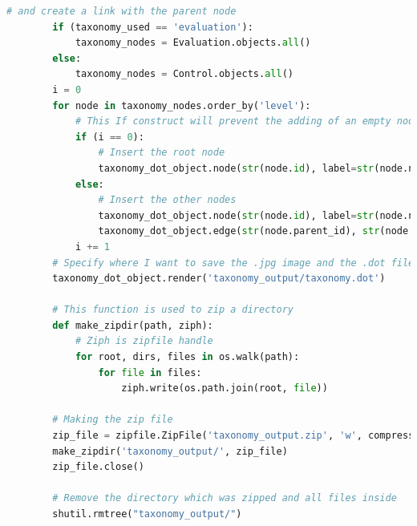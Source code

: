 \begin{itemize}
\begin{lstlisting}[language=Python, label=lst:view_DOT_eval, caption={Codice utilizzato per la realizzazione del
        file .dot e relativa immagine .jpg.}]
        # and create a link with the parent node
        if (taxonomy_used == 'evaluation'):
            taxonomy_nodes = Evaluation.objects.all()
        else:
            taxonomy_nodes = Control.objects.all()
        i = 0
        for node in taxonomy_nodes.order_by('level'):
            # This If construct will prevent the adding of an empty node to the root node in the graph
            if (i == 0):
                # Insert the root node
                taxonomy_dot_object.node(str(node.id), label=str(node.name))
            else:
                # Insert the other nodes
                taxonomy_dot_object.node(str(node.id), label=str(node.name))
                taxonomy_dot_object.edge(str(node.parent_id), str(node.id))
            i += 1
        # Specify where I want to save the .jpg image and the .dot file
        taxonomy_dot_object.render('taxonomy_output/taxonomy.dot')
 
        # This function is used to zip a directory
        def make_zipdir(path, ziph):
            # Ziph is zipfile handle
            for root, dirs, files in os.walk(path):
                for file in files:
                    ziph.write(os.path.join(root, file))
 
        # Making the zip file
        zip_file = zipfile.ZipFile('taxonomy_output.zip', 'w', compression=zipfile.ZIP_DEFLATED)
        make_zipdir('taxonomy_output/', zip_file)
        zip_file.close()
 
        # Remove the directory which was zipped and all files inside
        shutil.rmtree("taxonomy_output/")
 

\end{lstlisting}
\end{itemize}
